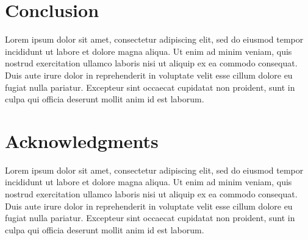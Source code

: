 \documentclass{sigchi}
\begin{document}
\section{Conclusion}
Lorem ipsum dolor sit amet, consectetur adipiscing elit, sed do eiusmod tempor incididunt ut labore et dolore magna aliqua. Ut enim ad minim veniam, quis nostrud exercitation ullamco laboris nisi ut aliquip ex ea commodo consequat. Duis aute irure dolor in reprehenderit in voluptate velit esse cillum dolore eu fugiat nulla pariatur. Excepteur sint occaecat cupidatat non proident, sunt in culpa qui officia deserunt mollit anim id est laborum.

\section{Acknowledgments}
Lorem ipsum dolor sit amet, consectetur adipiscing elit, sed do eiusmod tempor incididunt ut labore et dolore magna aliqua. Ut enim ad minim veniam, quis nostrud exercitation ullamco laboris nisi ut aliquip ex ea commodo consequat. Duis aute irure dolor in reprehenderit in voluptate velit esse cillum dolore eu fugiat nulla pariatur. Excepteur sint occaecat cupidatat non proident, sunt in culpa qui officia deserunt mollit anim id est laborum.

%
%
%
%
%
\balance{}



\end{document}
